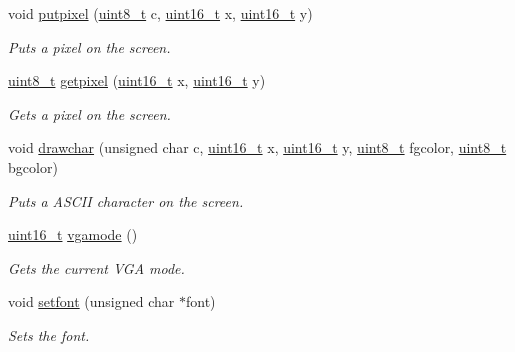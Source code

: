 \begin{DoxyCompactItemize}
\item 
void \hyperlink{a00032_ab17a69b465efb1ebe54a6a2e5d7b7ce8_ab17a69b465efb1ebe54a6a2e5d7b7ce8}{putpixel} (\hyperlink{a00101_aba7bc1797add20fe3efdf37ced1182c5_aba7bc1797add20fe3efdf37ced1182c5}{uint8\+\_\+t} c, \hyperlink{a00101_a273cf69d639a59973b6019625df33e30_a273cf69d639a59973b6019625df33e30}{uint16\+\_\+t} x, \hyperlink{a00101_a273cf69d639a59973b6019625df33e30_a273cf69d639a59973b6019625df33e30}{uint16\+\_\+t} y)
\begin{DoxyCompactList}\small\item\em Puts a pixel on the screen. \end{DoxyCompactList}\item 
\hyperlink{a00101_aba7bc1797add20fe3efdf37ced1182c5_aba7bc1797add20fe3efdf37ced1182c5}{uint8\+\_\+t} \hyperlink{a00032_aac0685da0bbf1115c2b76b0aedf7e1f0_aac0685da0bbf1115c2b76b0aedf7e1f0}{getpixel} (\hyperlink{a00101_a273cf69d639a59973b6019625df33e30_a273cf69d639a59973b6019625df33e30}{uint16\+\_\+t} x, \hyperlink{a00101_a273cf69d639a59973b6019625df33e30_a273cf69d639a59973b6019625df33e30}{uint16\+\_\+t} y)
\begin{DoxyCompactList}\small\item\em Gets a pixel on the screen. \end{DoxyCompactList}\item 
void \hyperlink{a00032_a2c8df7a20b47341b70d97a7ff21d86ea_a2c8df7a20b47341b70d97a7ff21d86ea}{drawchar} (unsigned char c, \hyperlink{a00101_a273cf69d639a59973b6019625df33e30_a273cf69d639a59973b6019625df33e30}{uint16\+\_\+t} x, \hyperlink{a00101_a273cf69d639a59973b6019625df33e30_a273cf69d639a59973b6019625df33e30}{uint16\+\_\+t} y, \hyperlink{a00101_aba7bc1797add20fe3efdf37ced1182c5_aba7bc1797add20fe3efdf37ced1182c5}{uint8\+\_\+t} fgcolor, \hyperlink{a00101_aba7bc1797add20fe3efdf37ced1182c5_aba7bc1797add20fe3efdf37ced1182c5}{uint8\+\_\+t} bgcolor)
\begin{DoxyCompactList}\small\item\em Puts a A\+S\+C\+II character on the screen. \end{DoxyCompactList}\item 
\hyperlink{a00101_a273cf69d639a59973b6019625df33e30_a273cf69d639a59973b6019625df33e30}{uint16\+\_\+t} \hyperlink{a00032_af6d170c9401ea8f94d4c5cf09347cca7_af6d170c9401ea8f94d4c5cf09347cca7}{vgamode} ()
\begin{DoxyCompactList}\small\item\em Gets the current V\+GA mode. \end{DoxyCompactList}\item 
void \hyperlink{a00032_abb01dc16ea34f0a6de3d10d732b6c536_abb01dc16ea34f0a6de3d10d732b6c536}{setfont} (unsigned char $\ast$font)
\begin{DoxyCompactList}\small\item\em Sets the font. \end{DoxyCompactList}\end{DoxyCompactItemize}
